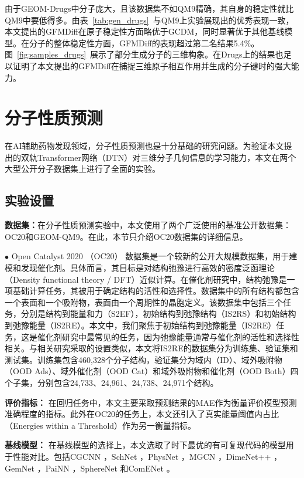 由于GEOM-Drugs中分子庞大，且该数据集不如QM9精确，其自身的稳定性就比QM9中要低得多。由表~\ref{tab:gen_drugs}~与QM9上实验展现出的优秀表现一致，本文提出的GFMDiff在原子稳定性方面略优于GCDM，同时显著优于其他基线模型。在分子的整体稳定性方面，GFMDiff的表现超过第二名结果5.4\%。图~\ref{fig:samples_drugs}~展示了部分生成分子的三维构象。在Drugs上的结果也足以证明了本文提出的GFMDiff在捕捉三维原子相互作用并生成的分子键时的强大能力。


\section{分子性质预测}
在AI辅助药物发现领域，分子性质预测也是十分基础的研究问题。为验证本文提出的双轨Transformer网络（DTN）对三维分子几何信息的学习能力，本文在两个大型公开分子数据集上进行了全面的实验。

\subsection{实验设置}
\textbf{数据集：}在分子性质预测实验中，本文使用了两个广泛使用的基准公开数据集：OC20和GEOM-QM9。在此，本节只介绍OC20数据集的详细信息。

$\bullet$ Open Catalyst 2020 （OC20） \cite{oc20_chanussot_21}数据集是一个较新的公开大规模数据集，用于建模和发现催化剂。具体而言，其目标是对结构弛豫进行高效的密度泛函理论（Density functional theory / DFT）近似计算。在催化剂研究中，结构弛豫是一项基础计算任务，其被用于确定结构的活性和选择性。数据集中的所有结构都包含一个表面和一个吸附物，表面由一个周期性的晶胞定义。该数据集中包括三个任务，分别是结构到能量和力（S2EF），初始结构到弛豫结构（IS2RS）和初始结构到弛豫能量（IS2RE）。本文中，我们聚焦于初始结构到弛豫能量（IS2RE）任务，这是催化剂研究中最常见的任务，因为弛豫能量通常与催化剂的活性和选择性相关。与相关研究采取的设置类似，本文将IS2RE的数据集分为训练集、验证集和测试集。训练集包含460,328个分子结构，验证集分为域内（ID）、域外吸附物（OOD Ads）、域外催化剂（OOD Cat）和域外吸附物和催化剂（OOD Both）四个子集，分别包含24,733、24,961、24,738、24,971个结构。

\textbf{评价指标：}
在回归任务中，本文主要采取预测结果的MAE作为衡量评价模型预测准确程度的指标。此外在OC20的任务上，本文还引入了真实能量阈值内占比（Energies within a Threshold）作为另一衡量指标。

\textbf{基线模型：}
在基线模型的选择上，本文选取了时下最优的有可复现代码的模型用于性能对比。包括CGCNN \cite{cgcnn_xie_18}，SchNet \cite{schnet_schutt_17}，PhysNet \cite{physnet_unke_19}，MGCN \cite{mgcn_lu_19}，DimeNet++ \cite{dimenetpp_gasteiger_20}，GemNet \cite{gemnet_gasteiger_21}，PaiNN \cite{painn_schutt_21}，SphereNet \cite{spherenet_liu_22}和ComENet \cite{comenet_wang_22}。

